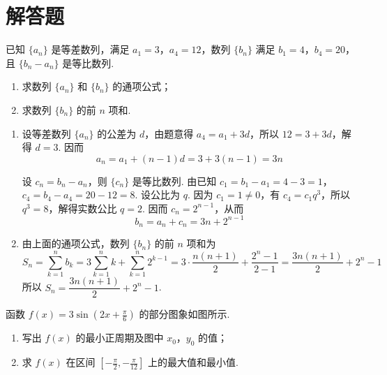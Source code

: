 \section{解答题}

\begin{problem}
已知 \( \{a_{n}\} \) 是等差数列，满足 \(a_{1}=3\)，\(a_{4}=12\)，数列 \( \{b_{n}\} \) 满足 \(b_{1}=4\)，\(b_{4}=20\)，且 \( \{b_{n}-a_{n}\} \) 是等比数列.

\begin{enumerate}
\item 求数列 \( \{a_{n}\} \) 和 \( \{b_{n}\} \) 的通项公式；
\item 求数列 \( \{b_{n}\} \) 的前 \(n\) 项和.
\end{enumerate}
\end{problem}

\begin{solution}
\begin{enumerate}
\item 设等差数列 \(\{a_n\}\) 的公差为 \(d\)，由题意得
\(a_4=a_1+3d\)，所以 \(12=3+3d\)，解得 \(d=3\). 因而
\[
a_n=a_1+(n-1)d=3+3(n-1)=3n
\]

设 \(c_n=b_n-a_n\)，则 \(\{c_n\}\) 是等比数列. 由已知
\(c_1=b_1-a_1=4-3=1\)，\(c_4=b_4-a_4=20-12=8\).
设公比为 \(q\). 因为 \(c_1=1\ne0\)，有 \(c_4=c_1q^3\)，所以 \(q^3=8\)，解得实数公比 \(q=2\). 因而 \(c_n=2^{n-1}\)，从而
\[
b_n=a_n+c_n=3n+2^{n-1}
\]

\item 由上面的通项公式，数列 \(\{b_n\}\) 的前 \(n\) 项和为
\[
S_n=\sum_{k=1}^{n}b_k=3\sum_{k=1}^{n}k+\sum_{k=1}^{n}2^{k-1}=3\cdot\frac{n(n+1)}2+\frac{2^n-1}{2-1}
=\frac{3n(n+1)}2+2^n-1
\]
所以 \(S_n=\dfrac{3n(n+1)}2+2^n-1\).
\end{enumerate}
\end{solution}

\begin{problem}
函数 \(f(x) = 3\sin \left(2x + \frac{\pi}{6}\right)\) 的部分图象如图所示.

\begin{enumerate}
\item 写出 \(f(x)\) 的最小正周期及图中 \(x_0\)，\(y_0\) 的值；
\item 求 \(f(x)\) 在区间 \(\left[-\frac{\pi}{2}, -\frac{\pi}{12}\right]\) 上的最大值和最小值.
\end{enumerate}

\end{problem}

